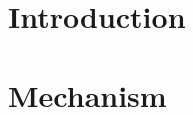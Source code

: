 \documentclass[a4paper]{article}
\begin{document}
\tableofcontents

\section{Introduction}


\section{Mechanism}

\end{document}
